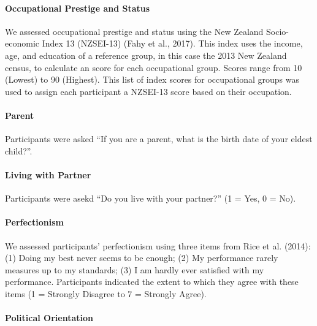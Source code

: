 \documentclass[
  letterpaper,
  DIV=11,
  numbers=noendperiod]{scrartcl}
\let\oldparagraph\paragraph
\renewcommand{\paragraph}[1]{\oldparagraph{#1}\mbox{}}
\begin{document}
\hypertarget{occupational-prestige-and-status}{%
\paragraph{Occupational Prestige and
Status}\label{occupational-prestige-and-status}}

We assessed occupational prestige and status using the New Zealand
Socio-economic Index 13 (NZSEI-13) (Fahy et al., 2017). This index uses
the income, age, and education of a reference group, in this case the
2013 New Zealand census, to calculate an score for each occupational
group. Scores range from 10 (Lowest) to 90 (Highest). This list of index
scores for occupational groups was used to assign each participant a
NZSEI-13 score based on their occupation.

\hypertarget{parent}{%
\paragraph{Parent}\label{parent}}

Participants were asked ``If you are a parent, what is the birth date of
your eldest child?''.

\hypertarget{living-with-partner}{%
\paragraph{Living with Partner}\label{living-with-partner}}

Participants were asekd ``Do you live with your partner?'' (1 = Yes, 0 =
No).

\hypertarget{perfectionism}{%
\paragraph{Perfectionism}\label{perfectionism}}

We assessed participants' perfectionism using three items from Rice et
al. (2014): (1) Doing my best never seems to be enough; (2) My
performance rarely measures up to my standards; (3) I am hardly ever
satisfied with my performance. Participants indicated the extent to
which they agree with these items (1 = Strongly Disagree to 7 = Strongly
Agree).

\hypertarget{political-orientation}{%
\paragraph{Political Orientation}\label{political-orientation}}
\end{document}
